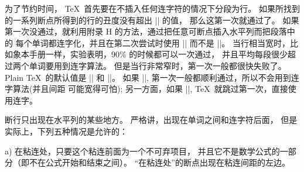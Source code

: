 \danger 为了节约时间， \TeX\ 首先要在不插入任何连字符的情况下分段为行。%
如果所找到的一系列断点所得到的行的丑度没有超出 |\pretolerance| 的值，
那么这第一次就通过了。%
如果第一次没通过，就利用附录 H 的方法，通过把任意可断点插入水平列而把段落中的%
每个单词都连字化，并且在第二次尝试时使用 |\tolerance| 而不是 |\pretolerance|。%
当行相当宽时，比如象本手册一样，实验表明，90\% 的时候都可以一次通过，
并且平均每段很少超过两个单词要用到连字算法。%
但是当行非常窄时，第一次一般都很快失败了。%
Plain \TeX\ 的默认值是 || 和 ||。%
如果 ||, 第一次一般都顺利通过，所以不会用到连字算法(并且间距%
可能宽得可怕);
另一方面，如果 ||,  \TeX\ 就跳过第一次，直接使用连字。

\danger 断行只出现在水平列的某些地方。%
严格讲，出现在单词之间和连字符后面，
但是实际上，下列五种情况是允许的：\enddanger

\smallskip
\item{a)} 在粘连处，只要这个粘连前面为一个不可弃项目，
并且它不是数学公式的一部分（即不在公式开始和结束之间）。
``在粘连处''的断点出现在粘连间距的左边。

